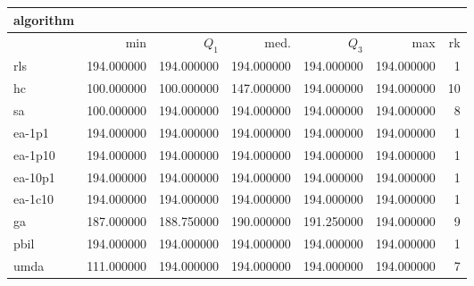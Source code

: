 \begin{tabular}{@{}l*{5}{>{{}}N{3}{0}}>{{}}N{2}{0}@{}}
\toprule
{algorithm} &  \\
\midrule
& {min} & {$Q_1$} & {med.} & {$Q_3$} & {max} & {rk}\\
\midrule
rls & {\color{blue}} 194.000000 & {\color{blue}} 194.000000 & {\color{blue}} 194.000000 & {\color{blue}} 194.000000 & {\color{blue}} 194.000000 & 1\\
hc & 100.000000 & 100.000000 & 147.000000 & {\color{blue}} 194.000000 & {\color{blue}} 194.000000 & 10\\
sa & 100.000000 & {\color{blue}} 194.000000 & {\color{blue}} 194.000000 & {\color{blue}} 194.000000 & {\color{blue}} 194.000000 & 8\\
ea-1p1 & {\color{blue}} 194.000000 & {\color{blue}} 194.000000 & {\color{blue}} 194.000000 & {\color{blue}} 194.000000 & {\color{blue}} 194.000000 & 1\\
ea-1p10 & {\color{blue}} 194.000000 & {\color{blue}} 194.000000 & {\color{blue}} 194.000000 & {\color{blue}} 194.000000 & {\color{blue}} 194.000000 & 1\\
ea-10p1 & {\color{blue}} 194.000000 & {\color{blue}} 194.000000 & {\color{blue}} 194.000000 & {\color{blue}} 194.000000 & {\color{blue}} 194.000000 & 1\\
ea-1c10 & {\color{blue}} 194.000000 & {\color{blue}} 194.000000 & {\color{blue}} 194.000000 & {\color{blue}} 194.000000 & {\color{blue}} 194.000000 & 1\\
ga & 187.000000 & 188.750000 & 190.000000 & 191.250000 & {\color{blue}} 194.000000 & 9\\
pbil & {\color{blue}} 194.000000 & {\color{blue}} 194.000000 & {\color{blue}} 194.000000 & {\color{blue}} 194.000000 & {\color{blue}} 194.000000 & 1\\
umda & 111.000000 & {\color{blue}} 194.000000 & {\color{blue}} 194.000000 & {\color{blue}} 194.000000 & {\color{blue}} 194.000000 & 7\\
\bottomrule
\end{tabular}
